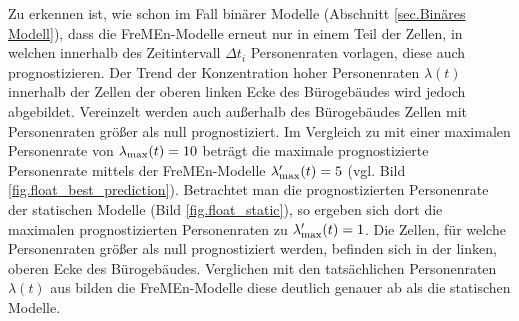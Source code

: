 Zu erkennen ist, wie schon im Fall binärer Modelle (Abschnitt \ref{sec.Binäres Modell}), dass die FreMEn-Modelle erneut nur in einem Teil der Zellen, in welchen innerhalb des Zeitintervall $\Delta t_i$ Personenraten vorlagen, diese auch prognostizieren. Der Trend der Konzentration hoher Personenraten $\lambda (t)$ innerhalb der Zellen der oberen linken Ecke des Bürogebäudes wird jedoch abgebildet. Vereinzelt werden auch außerhalb des Bürogebäudes Zellen mit Personenraten größer als null prognostiziert. Im Vergleich zu  mit einer maximalen Personenrate von $\lambda_{\mathrm{max}} (t) = 10$ beträgt die maximale prognostizierte Personenrate mittels der FreMEn-Modelle $\lambda'_{\mathrm{max}} (t) = 5$ (vgl. Bild \ref{fig.float_best_prediction}). Betrachtet man die prognostizierten Personenrate der statischen Modelle (Bild \ref{fig.float_static}), so ergeben sich dort die maximalen prognostizierten Personenraten zu $\lambda'_{\mathrm{max}} (t) = 1$. Die Zellen, für welche Personenraten größer als null prognostiziert werden, befinden sich in der linken, oberen Ecke des Bürogebäudes. Verglichen mit den tatsächlichen Personenraten $\lambda (t)$ aus  bilden die FreMEn-Modelle diese deutlich genauer ab als die statischen Modelle.


